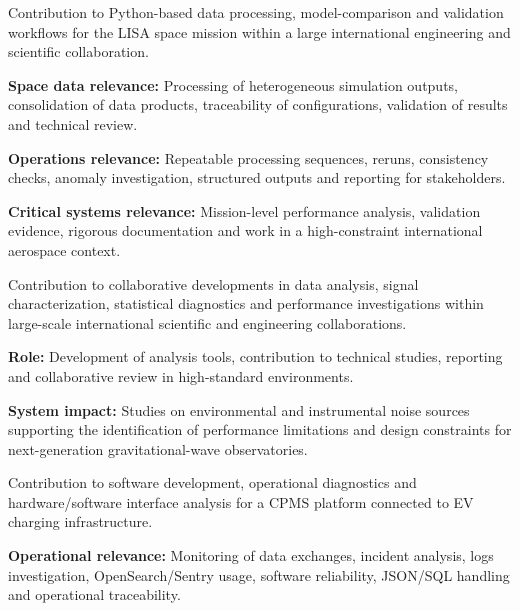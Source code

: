 \documentclass[8pt,a4paper,ragged2e,withhyper]{altacv}
\begin{document}


Contribution to Python-based data processing, model-comparison and validation workflows for the LISA space mission within a large international engineering and scientific collaboration.

\textbf{Space data relevance:} Processing of heterogeneous simulation outputs, consolidation of data products, traceability of configurations, validation of results and technical review.

\textbf{Operations relevance:} Repeatable processing sequences, reruns, consistency checks, anomaly investigation, structured outputs and reporting for stakeholders.

\textbf{Critical systems relevance:} Mission-level performance analysis, validation evidence, rigorous documentation and work in a high-constraint international aerospace context.

\divider


Contribution to collaborative developments in data analysis, signal characterization, statistical diagnostics and performance investigations within large-scale international scientific and engineering collaborations.

\textbf{Role:} Development of analysis tools, contribution to technical studies, reporting and collaborative review in high-standard environments.

\textbf{System impact:} Studies on environmental and instrumental noise sources supporting the identification of performance limitations and design constraints for next-generation gravitational-wave observatories.

\divider


Contribution to software development, operational diagnostics and hardware/software interface analysis for a CPMS platform connected to EV charging infrastructure.

\textbf{Operational relevance:} Monitoring of data exchanges, incident analysis, logs investigation, OpenSearch/Sentry usage, software reliability, JSON/SQL handling and operational traceability.
\end{document}
